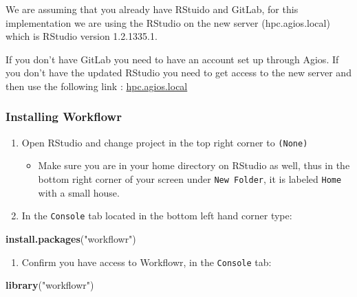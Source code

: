 \documentclass[openany]{book}
\newenvironment{Shaded}{\begin{snugshade}}{\end{snugshade}}
\newcommand{\KeywordTok}[1]{\textcolor[rgb]{0.13,0.29,0.53}{\textbf{#1}}}
\newcommand{\NormalTok}[1]{#1}
\newcommand{\StringTok}[1]{\textcolor[rgb]{0.31,0.60,0.02}{#1}}
\providecommand{\tightlist}{%
  \setlength{\itemsep}{0pt}\setlength{\parskip}{0pt}}
\begin{document}
We are assuming that you already have RStuido and GitLab, for this implementation we are using the RStudio on the new server (hpc.agios.local) which is RStudio version 1.2.1335.1.

If you don't have GitLab you need to have an account set up through Agios. If you don't have the updated RStudio you need to get access to the new server and then use the following link : \href{https://hpc.agios.local}{hpc.agios.local}

\hypertarget{installing-workflowr}{%
\subsubsection{Installing Workflowr}\label{installing-workflowr}}

\begin{enumerate}
\def\labelenumi{\arabic{enumi}.}
\tightlist
\item
  Open RStudio and change project in the top right corner to \texttt{(None)}

  \begin{itemize}
  \tightlist
  \item
    Make sure you are in your home directory on RStudio as well, thus in the bottom right corner of your screen under \texttt{New\ Folder}, it is labeled \texttt{Home} with a small house.
  \end{itemize}
\item
  In the \texttt{Console} tab located in the bottom left hand corner type:
\end{enumerate}

\begin{Shaded}
\begin{Highlighting}[]
\KeywordTok{install.packages}\NormalTok{(}\StringTok{"workflowr"}\NormalTok{)}
\end{Highlighting}
\end{Shaded}

\begin{enumerate}
\def\labelenumi{\arabic{enumi}.}
\setcounter{enumi}{2}
\tightlist
\item
  Confirm you have access to Workflowr, in the \texttt{Console} tab:
\end{enumerate}

\begin{Shaded}
\begin{Highlighting}[]
\KeywordTok{library}\NormalTok{(}\StringTok{"workflowr"}\NormalTok{)}
\end{Highlighting}
\end{Shaded}
\end{document}
